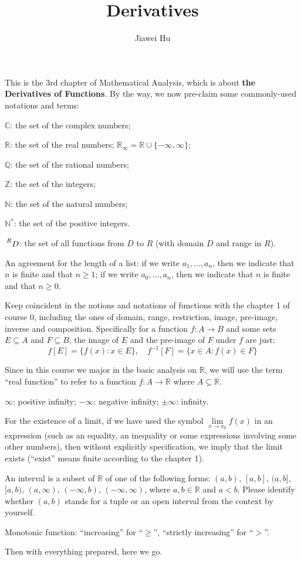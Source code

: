 \documentclass{article}
\title{\LARGE \textbf{Derivatives}}
\author{\large Jiawei Hu}
\begin{document}
\maketitle

This is the 3rd chapter of Mathematical Analysis, which is about \textbf{the Derivatives of Functions}. By the way, we now pre-claim some commonly-used notations and terms:
\begin{compactenum}
    \item $\mathbb{C}$: the set of the complex numbers;
    \item $\mathbb{R}$: the set of the real numbers; $\mathbb{R}_\infty = \mathbb{R}\cup\{-\infty, \infty\}$;
    \item $\mathbb{Q}$: the set of the rational numbers;
    \item $\mathbb{Z}$: the set of the integers;
    \item $\mathbb{N}$: the set of the natural numbers;
    \item $\mathbb{N^\ast}$: the set of the positive integers.
    \item $\sideset{^R}{}{\mathop{D}}$: the set of all functions from $D$ to $R$ (with domain $D$ and range in $R$).
    \item An agreement for the length of a list: if we write $a_1, \dots, a_n$, then we indicate that $n$ is finite and that $n\geq 1$; if we write $a_0, \dots, a_n$, then we indicate that $n$ is finite and that $n\geq 0$.
    \item Keep coincident in the notions and notations of functions with the chapter 1 of course 0, including the ones of domain, range, restriction, image, pre-image, inverse and composition. Specifically for a function $f: A\rightarrow B$ and some sets $E\subseteq A$ and $F\subseteq B$, the image of $E$ and the pre-image of $F$ under $f$ are just:
    $$f[E] = \{f(x): x\in E\},\quad f^{-1}[F] = \{x\in A: f(x)\in F\}$$
    \item Since in this course we major in the basic analysis on $\mathbb{R}$, we will use the term ``real function'' to refer to a function $f: A\rightarrow \mathbb{R}$ where $A\subseteq \mathbb{R}$.
    \item $\infty$: positive infinity; $-\infty$: negative infinity; $\pm\infty$: infinity.
    \item For the existence of a limit, if we have used the symbol $\lim\limits_{x\to x_0} f(x)$ in an expression (such as an equality, an inequality or some expressions involving some other numbers), then without explicitly specification, we imply that the limit exists (``exist'' means finite according to the chapter 1).
    \item An interval is a subset of $\mathbb{R}$ of one of the following forms: $(a,b)$, $[a,b]$, $(a,b]$, $[a,b)$, $(a, \infty)$, $(-\infty, b)$, $(-\infty, \infty)$, where $a, b\in\mathbb{R}$ and $a<b$. Please identify whether $(a,b)$ stands for a tuple or an open interval from the context by yourself.
    \item Monotonic function: ``increasing'' for ``$\geq$'', ``strictly increasing'' for ``$>$''.
\end{compactenum} 
Then with everything prepared, here we go.
\end{document}
